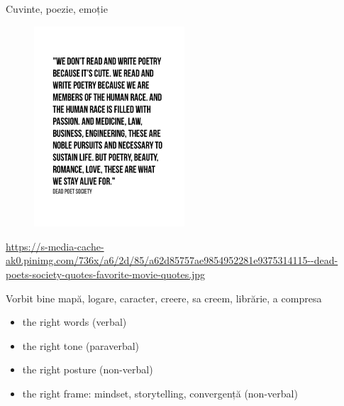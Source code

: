 \documentclass{beamer}
\begin{document}
\begin{frame}{Cuvinte, poezie, emoție}
  \begin{figure}
    \centering
    \includegraphics[width=0.5\textwidth]{img/dead-poets-society-words-alive}
  \end{figure}
  \begin{center}
    \tiny
    \url{https://s-media-cache-ak0.pinimg.com/736x/a6/2d/85/a62d85757ae9854952281e9375314115--dead-poets-society-quotes-favorite-movie-quotes.jpg}
  \end{center}
\end{frame}

\begin{frame}{Vorbit bine}
  \pause
  mapă, logare, caracter, creere, sa creem, librărie, a compresa\\
  \vspace{5mm}
  \begin{itemize}
    \pause
    \item the right words (verbal)
    \pause
    \item the right tone (paraverbal)
    \pause
    \item the right posture (non-verbal)
    \pause
    \item the right frame: mindset, storytelling, convergență (non-verbal)
  \end{itemize}
\end{frame}
\end{document}
